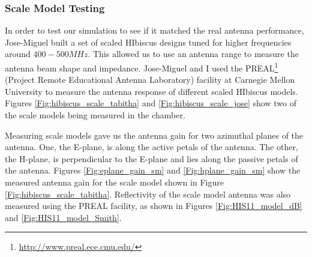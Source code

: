 \subsubsection{Scale Model Testing}

In order to test our simulation to see if it matched the real antenna performance, Jose-Miguel built a set of scaled HIbiscus designs tuned for higher frequencies around $400-500 MHz$. This allowed us to use an antenna range to measure the antenna beam shape and impedance. Jose-Miguel and I used the PREAL\footnote{\url{http://www.preal.ece.cmu.edu/}} (Project Remote Educational Antenna Laboratory) facility at Carnegie Mellon University to measure the antenna response of different scaled HIbiscus models. Figures \ref{Fig:hibiscus_scale_tabitha} and \ref{Fig:hibiscus_scale_jose} show two of the scale models being measured in the chamber.

Measuring scale models gave us the antenna gain for two azimuthal planes of the antenna. One, the E-plane, is along the active petals of the antenna. The other, the H-plane, is perpendicular to the E-plane and lies along the passive petals of the antenna. Figures \ref{Fig:eplane_gain_sm} and \ref{Fig:hplane_gain_sm} show the measured antenna gain for the scale model shown in Figure \ref{Fig:hibiscus_scale_tabitha}. Reflectivity of the scale model antenna was also measured using the PREAL facility, as shown in Figures \ref{Fig:HIS11_model_dB} and \ref{Fig:HIS11_model_Smith}.


